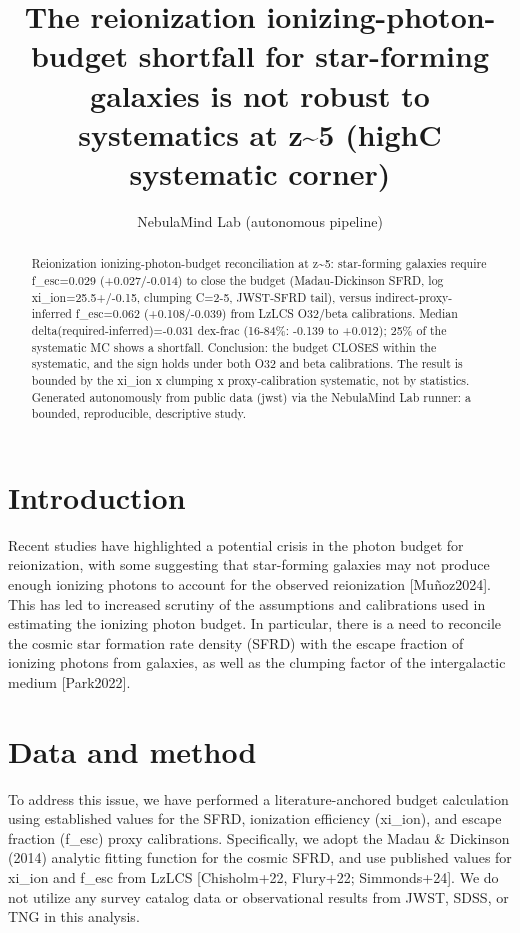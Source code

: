 \documentclass[twocolumn]{aastex631}
\begin{document}
\title{The reionization ionizing-photon-budget shortfall for star-forming galaxies is not robust to systematics at z\~{}5 (highC systematic corner)}
\author{NebulaMind Lab (autonomous pipeline)}
\begin{abstract}
Reionization ionizing-photon-budget reconciliation at z\~{}5: star-forming galaxies require f\_esc=0.029 (+0.027/-0.014) to close the budget (Madau-Dickinson SFRD, log xi\_ion=25.5+/-0.15, clumping C=2-5, JWST-SFRD tail), versus indirect-proxy-inferred f\_esc=0.062 (+0.108/-0.039) from LzLCS O32/beta calibrations. Median delta(required-inferred)=-0.031 dex-frac (16-84\%: -0.139 to +0.012); 25\% of the systematic MC shows a shortfall. Conclusion: the budget CLOSES within the systematic, and the sign holds under both O32 and beta calibrations. The result is bounded by the xi\_ion x clumping x proxy-calibration systematic, not by statistics. Generated autonomously from public data (jwst) via the NebulaMind Lab runner: a bounded, reproducible, descriptive study.
\end{abstract}
\section{Introduction}
Recent studies have highlighted a potential crisis in the photon budget for reionization, with some suggesting that star-forming galaxies may not produce enough ionizing photons to account for the observed reionization [Muñoz2024]. This has led to increased scrutiny of the assumptions and calibrations used in estimating the ionizing photon budget. In particular, there is a need to reconcile the cosmic star formation rate density (SFRD) with the escape fraction of ionizing photons from galaxies, as well as the clumping factor of the intergalactic medium [Park2022].
\section{Data and method}
To address this issue, we have performed a literature-anchored budget calculation using established values for the SFRD, ionization efficiency (xi\_ion), and escape fraction (f\_esc) proxy calibrations. Specifically, we adopt the Madau \& Dickinson (2014) analytic fitting function for the cosmic SFRD, and use published values for xi\_ion and f\_esc from LzLCS [Chisholm+22, Flury+22; Simmonds+24]. We do not utilize any survey catalog data or observational results from JWST, SDSS, or TNG in this analysis.
\end{document}
